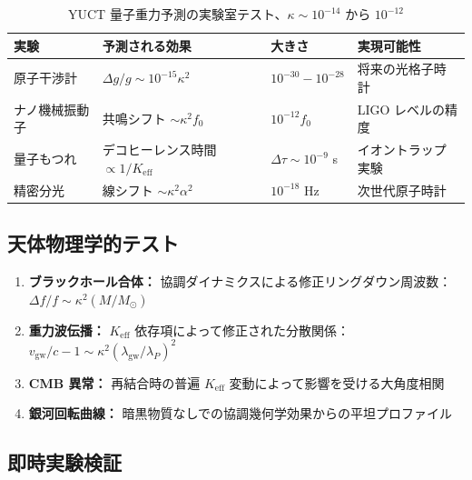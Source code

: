 \documentclass[11pt,a4paper]{article}
\theoremstyle{remark}
\newcommand{\Keff}{K_{\mathrm{eff}}}
\begin{document}
	\begin{table}[htbp]
		\centering
		\begin{tabular}{p{2.8cm}p{4.2cm}p{2.5cm}p{2.5cm}}
			\toprule
			\textbf{実験} & \textbf{予測される効果} & \textbf{大きさ} & \textbf{実現可能性} \\
			\midrule
			原子干渉計 & $\Delta g/g \sim 10^{-15}\kappa^2$ & $10^{-30} - 10^{-28}$ & 将来の光格子時計 \\
			ナノ機械振動子 & 共鳴シフト $\sim \kappa^2 f_0$ & $10^{-12} f_0$ & LIGO レベルの精度 \\
			量子もつれ & デコヒーレンス時間 $\propto 1/\Keff$ & $\Delta\tau \sim 10^{-9}$ s & イオントラップ実験 \\
			精密分光 & 線シフト $\sim \kappa^2 \alpha^2$ & $10^{-18}$ Hz & 次世代原子時計 \\
			\bottomrule
		\end{tabular}
		\caption{YUCT 量子重力予測の実験室テスト、$\kappa \sim 10^{-14}$ から $10^{-12}$}
		\label{tab:lab-tests}
	\end{table}
	
	\subsection{天体物理学的テスト}
	
	\begin{enumerate}
		\item \textbf{ブラックホール合体：} 協調ダイナミクスによる修正リングダウン周波数：$\Delta f/f \sim \kappa^2 (M/M_\odot)$
		
		\item \textbf{重力波伝播：} $\Keff$ 依存項によって修正された分散関係：$v_{\text{gw}}/c - 1 \sim \kappa^2 (\lambda_{\text{gw}}/\lambda_P)^2$
		
		\item \textbf{CMB 異常：} 再結合時の普遍 $\Keff$ 変動によって影響を受ける大角度相関
		
		\item \textbf{銀河回転曲線：} 暗黒物質なしでの協調幾何学効果からの平坦プロファイル
	\end{enumerate}
	
	\subsection{即時実験検証}
	
\end{document}
